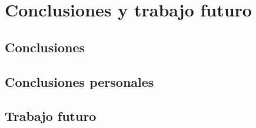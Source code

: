 \section{Conclusiones y trabajo futuro}

\subsection{Conclusiones}

\subsection{Conclusiones personales}

\subsection{Trabajo futuro}
